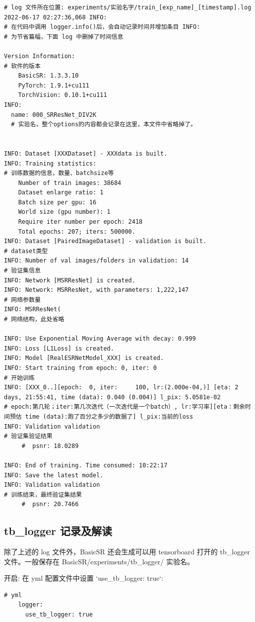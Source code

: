\documentclass[../main.tex]{subfiles}
\begin{document}
\begin{verbatim}
# log 文件所在位置: experiments/实验名字/train_[exp_name]_[timestamp].log
2022-06-17 02:27:36,068 INFO:
# 在代码中调用 logger.info()后，会自动记录时间并增加条目 INFO:
# 为节省篇幅，下面 log 中删掉了时间信息

Version Information:
# 软件的版本
    BasicSR: 1.3.3.10
    PyTorch: 1.9.1+cu111
    TorchVision: 0.10.1+cu111
INFO:
  name: 000_SRResNet_DIV2K
  # 实验名，整个options的内容都会记录在这里，本文件中省略掉了。


INFO: Dataset [XXXDataset] - XXXdata is built.
INFO: Training statistics:
# 训练数据的信息，数量、batchsize等
    Number of train images: 38684
    Dataset enlarge ratio: 1
    Batch size per gpu: 16
    World size (gpu number): 1
    Require iter number per epoch: 2418
    Total epochs: 207; iters: 500000.
INFO: Dataset [PairedImageDataset] - validation is built.
# dataset类型
INFO: Number of val images/folders in validation: 14
# 验证集信息
INFO: Network [MSRResNet] is created.
INFO: Network: MSRResNet, with parameters: 1,222,147
# 网络参数量
INFO: MSRResNet(
# 网络结构，此处省略

INFO: Use Exponential Moving Average with decay: 0.999
INFO: Loss [L1Loss] is created.
INFO: Model [RealESRNetModel_XXX] is created.
INFO: Start training from epoch: 0, iter: 0
# 开始训练
INFO: [XXX_0..][epoch:  0, iter:     100, lr:(2.000e-04,)] [eta: 2 days, 21:55:41, time (data): 0.040 (0.004)] l_pix: 5.0581e-02
# epoch:第几轮；iter:第几次迭代（一次迭代是一个batch）, lr:学习率][eta：剩余时间预估 time (data):跑了百分之多少的数据了] l_pix:当前的loss
INFO: Validation validation
# 验证集验证结果
     #  psnr: 18.0289

INFO: End of training. Time consumed: 10:22:17
INFO: Save the latest model.
INFO: Validation validation
# 训练结束，最终验证集结果
     #  psnr: 20.7466

\end{verbatim}

\subsection{tb\_logger 记录及解读}

除了上述的 log 文件外，BasicSR 还会生成可以用 tensorboard 打开的 tb\_logger 文件。一般保存在 BasicSR/experiments/tb\_logger/ 实验名。


开启: 在 yml 配置文件中设置 `use\_tb\_logger: true`:
\begin{verbatim}
# yml
    logger:
      use_tb_logger: true
\end{verbatim}
\end{document}
